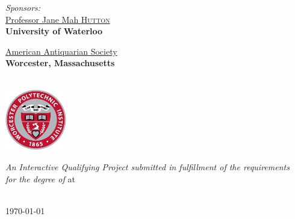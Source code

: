 \documentclass[
11pt, %
english, %
singlespacing, %
headsepline, %
]{MastersDoctoralThesis} %
\begin{document}
\begin{titlepage}
\begin{center}
\begin{minipage}[t]{0.4\textwidth}
\begin{flushright}
\emph{Sponsors:} \\
\href{https://uwaterloo.ca/architecture/profile/j2hutton}{Professor Jane Mah \textsc{Hutton}}\\
{\small \bfseries University of Waterloo}\vspace{0.4cm}

\href{https://www.americanantiquarian.org/}{American Antiquarian Society}\\
{\small \bfseries Worcester, Massachusetts}

\end{flushright}
\end{minipage}\\[1.5cm]

\includegraphics[width=0.2\textwidth]{Images/university.png}

\vfill

\large \textit{An Interactive Qualifying Project submitted in fulfillment of the requirements\\ for the degree of \degreename} at\\[0.3cm] %
\groupname \\[2cm] %
 
\vfill

{\large \monthyeardate\today}\\[4cm] %
 
\vfill
\end{center}
\end{titlepage}

\end{document}
